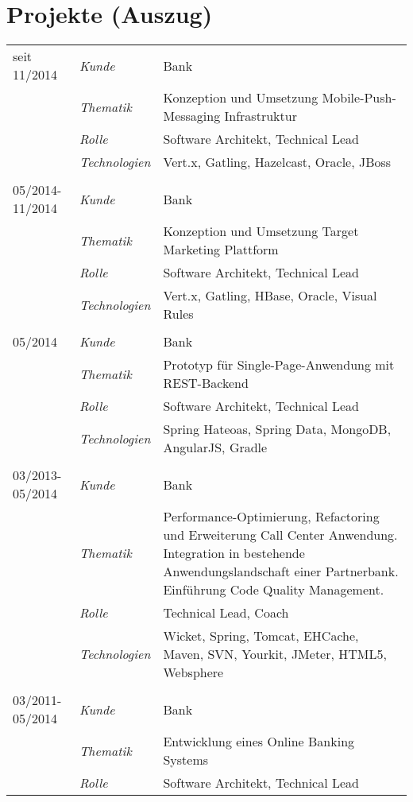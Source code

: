 \section*{Projekte (Auszug)}
\renewcommand{\arraystretch}{1.3}
\begin{longtable}{@{}>{}p{4cm}>{\itshape}p{2cm}>{}p{9cm}}
seit 11/2014        & Kunde 	    & Bank\\
\nopagebreak		& Thematik	    & Konzeption und Umsetzung Mobile-Push-Messaging Infrastruktur\\
\nopagebreak		& Rolle 	    & Software Architekt, Technical Lead\\
\nopagebreak		& Technologien	& Vert.x, Gatling, Hazelcast, Oracle, JBoss\\
\\
05/2014-11/2014     & Kunde 	    & Bank\\
\nopagebreak		& Thematik	    & Konzeption und Umsetzung Target Marketing Plattform \\
\nopagebreak		& Rolle 	    & Software Architekt, Technical Lead\\
\nopagebreak		& Technologien	& Vert.x, Gatling, HBase, Oracle, Visual Rules\\
\\
05/2014             & Kunde 	        & Bank\\
\nopagebreak		& Thematik	    & Prototyp für Single-Page-Anwendung mit REST-Backend\\
\nopagebreak		& Rolle 	    & Software Architekt, Technical Lead\\
\nopagebreak		& Technologien	& Spring Hateoas, Spring Data, MongoDB, AngularJS, Gradle\\
\\
03/2013-05/2014     & Kunde 	    & Bank\\
\nopagebreak		& Thematik	    & Performance-Optimierung, Refactoring und Erweiterung Call Center Anwendung. Integration in bestehende Anwendungslandschaft einer Partnerbank. Einführung Code Quality Management.\\
\nopagebreak		& Rolle 	    & Technical Lead, Coach\\
\nopagebreak		& Technologien	& Wicket, Spring, Tomcat, EHCache, Maven, SVN, Yourkit, JMeter, HTML5, Websphere\\
\\
03/2011-05/2014     & Kunde 	    & Bank\\
\nopagebreak		& Thematik	    & Entwicklung eines Online Banking Systems\\
\nopagebreak		& Rolle 	    & Software Architekt, Technical Lead\\

\end{longtable}
